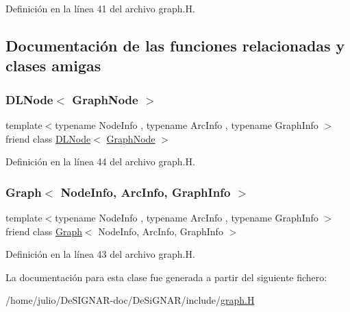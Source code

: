 Definición en la línea 41 del archivo graph.\+H.



\subsection{Documentación de las funciones relacionadas y clases amigas}
\mbox{\label{class_designar_1_1_graph_node_a5d0e7b51039a0eb5cfdfdb2f3701f06d}} 
\subsubsection{\texorpdfstring{D\+L\+Node$<$ Graph\+Node $>$}{DLNode< GraphNode >}}
{\footnotesize\ttfamily template$<$typename Node\+Info , typename Arc\+Info , typename Graph\+Info $>$ \\
friend class \hyperlink{class_designar_1_1_d_l_node}{D\+L\+Node}$<$ \hyperlink{class_designar_1_1_graph_node}{Graph\+Node} $>$\hspace{0.3cm}{\ttfamily [friend]}}



Definición en la línea 44 del archivo graph.\+H.

\mbox{\label{class_designar_1_1_graph_node_a0a9834688687d864501bbb9c85b0d32c}} 
\subsubsection{\texorpdfstring{Graph$<$ Node\+Info, Arc\+Info, Graph\+Info $>$}{Graph< NodeInfo, ArcInfo, GraphInfo >}}
{\footnotesize\ttfamily template$<$typename Node\+Info , typename Arc\+Info , typename Graph\+Info $>$ \\
friend class \hyperlink{class_designar_1_1_graph}{Graph}$<$ Node\+Info, Arc\+Info, Graph\+Info $>$\hspace{0.3cm}{\ttfamily [friend]}}



Definición en la línea 43 del archivo graph.\+H.



La documentación para esta clase fue generada a partir del siguiente fichero\+:\begin{DoxyCompactItemize}
\item 
/home/julio/\+De\+S\+I\+G\+N\+A\+R-\/doc/\+De\+Si\+G\+N\+A\+R/include/\hyperlink{graph_8_h}{graph.\+H}\end{DoxyCompactItemize}
